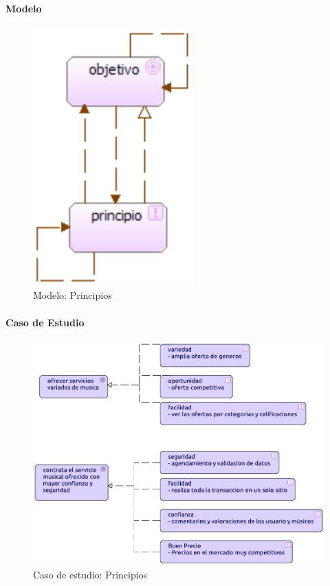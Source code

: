 \paragraph{Modelo}
\begin{figure}[h!]
	\centering
	\includegraphics[width=0.4\linewidth]{Desarrollo/ArquitecturaEmpresarial/Motivacion/imgs/PrincipiosMetamodelo.PNG}
	\caption{Modelo: Principios}
\end{figure}
\newpage
\paragraph{Caso de Estudio}
\begin{figure}[h!]
	\centering
	\includegraphics[width=\linewidth]{Desarrollo/ArquitecturaEmpresarial/Motivacion/imgs/Principios.pdf}
	\caption{Caso de estudio: Principios}
	\label{fig:comportamiento}
\end{figure}

